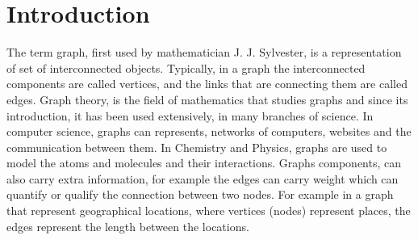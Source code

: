 \documentclass[english]{tktltiki}
\begin{document}
\section{Introduction}
The term graph, first used by mathematician J. J. Sylvester, is a representation of set of interconnected objects. Typically, in a graph the interconnected components are called vertices, and the links that are connecting them are called edges. Graph theory, is the field of mathematics that studies graphs and since its introduction, it has been used extensively, in many branches of science. In computer science, graphs can represents, networks of computers, websites and the communication between them. In Chemistry and Physics, graphs are used to model the atoms and molecules and their interactions. Graphs components, can also carry extra information, for example the edges can carry weight which can quantify or qualify the connection between two nodes. For example in a graph that represent geographical locations, where vertices (nodes) represent places, the edges represent the length between the locations. \\
\end{document}
